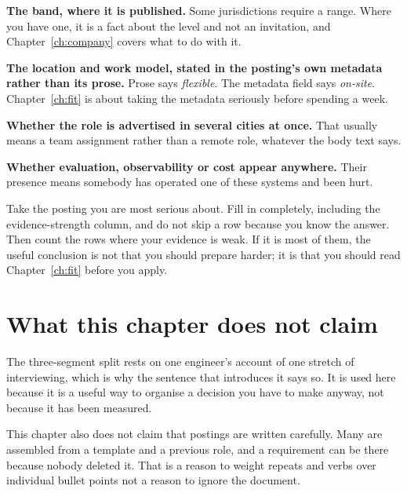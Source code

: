 \textbf{The band, where it is published.} Some jurisdictions require a range.
Where you have one, it is a fact about the level and not an invitation, and
Chapter~\ref{ch:company} covers what to do with it.

\textbf{The location and work model, stated in the posting's own metadata
rather than its prose.} Prose says \emph{flexible}. The metadata field says
\emph{on-site}. Chapter~\ref{ch:fit} is about taking the metadata seriously
before spending a week.

\textbf{Whether the role is advertised in several cities at once.} That usually
means a team assignment rather than a remote role, whatever the body text says.

\textbf{Whether evaluation, observability or cost appear anywhere.} Their
presence means somebody has operated one of these systems and been hurt.

\begin{drill}
Take the posting you are most serious about. Fill in
 completely, including the evidence-strength
column, and do not skip a row because you know the answer. Then count the rows
where your evidence is weak. If it is most of them, the useful conclusion is
not that you should prepare harder; it is that you should read
Chapter~\ref{ch:fit} before you apply.
\end{drill}

\section*{What this chapter does not claim}

The three-segment split rests on one engineer's account of one stretch of
interviewing, which is why the sentence that introduces it says so. It is used
here because it is a useful way to organise a decision you have to make anyway,
not because it has been measured.

This chapter also does not claim that postings are written carefully. Many are
assembled from a template and a previous role, and a requirement can be there
because nobody deleted it. That is a reason to weight repeats and verbs over
individual bullet points \dash{} not a reason to ignore the document.
